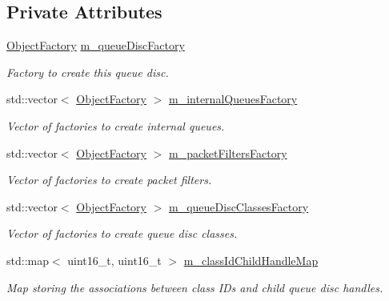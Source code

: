 \subsection*{Private Attributes}
\begin{DoxyCompactItemize}
\item 
\hyperlink{classns3_1_1ObjectFactory}{Object\+Factory} \hyperlink{classns3_1_1QueueDiscFactory_acc62f610bfd64e570a89891a1941a197}{m\+\_\+queue\+Disc\+Factory}
\begin{DoxyCompactList}\small\item\em Factory to create this queue disc. \end{DoxyCompactList}\item 
std\+::vector$<$ \hyperlink{classns3_1_1ObjectFactory}{Object\+Factory} $>$ \hyperlink{classns3_1_1QueueDiscFactory_a1662d1d7c56f001ee2cec98eeffd641e}{m\+\_\+internal\+Queues\+Factory}
\begin{DoxyCompactList}\small\item\em Vector of factories to create internal queues. \end{DoxyCompactList}\item 
std\+::vector$<$ \hyperlink{classns3_1_1ObjectFactory}{Object\+Factory} $>$ \hyperlink{classns3_1_1QueueDiscFactory_aba9caa76a10faa6bb43d8e8a43125dcb}{m\+\_\+packet\+Filters\+Factory}
\begin{DoxyCompactList}\small\item\em Vector of factories to create packet filters. \end{DoxyCompactList}\item 
std\+::vector$<$ \hyperlink{classns3_1_1ObjectFactory}{Object\+Factory} $>$ \hyperlink{classns3_1_1QueueDiscFactory_ad173551ed51d3398656bc755a7e28290}{m\+\_\+queue\+Disc\+Classes\+Factory}
\begin{DoxyCompactList}\small\item\em Vector of factories to create queue disc classes. \end{DoxyCompactList}\item 
std\+::map$<$ uint16\+\_\+t, uint16\+\_\+t $>$ \hyperlink{classns3_1_1QueueDiscFactory_ab2b0a6cfbbd588b14617fcf5079311b2}{m\+\_\+class\+Id\+Child\+Handle\+Map}
\begin{DoxyCompactList}\small\item\em Map storing the associations between class I\+Ds and child queue disc handles. \end{DoxyCompactList}\end{DoxyCompactItemize}


